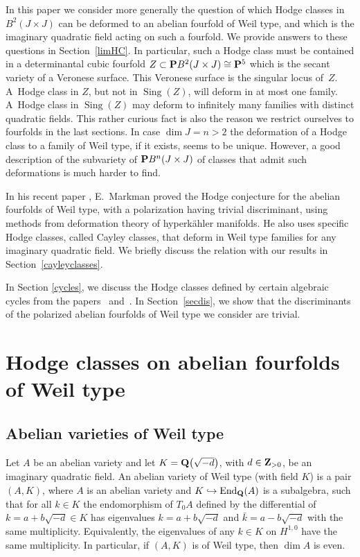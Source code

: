 \documentclass[10pt,a4paper]{amsart}
\numberwithin{equation}{section}
\begin{document}
In this paper we consider more generally the question
of which Hodge classes in $B^2(J\times J)$
can be deformed to an abelian fourfold of Weil type,
and which is the imaginary quadratic field acting on such a fourfold.
We provide answers to these questions in Section~\ref{limHC}.
In particular, such a Hodge class must be contained
in a determinantal cubic fourfold $Z\subset {\bf P} B^2(J\times J)\cong {\bf P}^5$
which is the secant variety of a Veronese surface.
This Veronese surface is the singular locus of~$Z$. A~Hodge class in $Z$, but not in $\operatorname{Sing}(Z)$,
will deform in at most one family. A~Hodge class in $\operatorname{Sing}(Z)$ may
deform to infinitely many families with distinct quadratic fields.
This rather curious fact is also the reason we restrict ourselves to fourfolds in the last sections.
In case $\dim J=n>2$ the deformation of a Hodge class to a family of Weil type, if it exists,
seems to be unique. However, a good description of the subvariety of ${\bf P} B^n(J\times J)$ of classes
that admit such deformations is much harder to find.

In his recent paper \cite{Markman}, E.~Markman
proved the Hodge conjecture for the
abelian fourfolds of Weil type,
with a polarization having trivial discriminant, using methods
from deformation theory of hyperk\"ahler manifolds. He also uses specific Hodge classes,
called Cayley classes, that deform in Weil type families for any imaginary quadratic field.
We briefly discuss the relation with our results in Section~\ref{cayleyclasses}.

In Section \ref{cycles}, we discuss the Hodge classes defined by certain algebraic
cycles from the papers~\cite{schoen} and~\cite{vG}.
In Section~\ref{secdis}, we show that the discriminants of the polarized abelian fourfolds
of Weil type we consider are trivial.

\section{Hodge classes on abelian fourfolds of Weil type}\label{ab4w}

\subsection{Abelian varieties of Weil type}
Let $A$ be an abelian variety and let $K={\bf Q}\big(\sqrt{-d}\big)$, with $d\in{\bf Z}_{>0}$,
be an imaginary quadratic field. An abelian variety of Weil type (with field
$K$) is a pair $(A,K)$, where $A$ is an abelian variety and $K\hookrightarrow \operatorname{End}_{\bf Q}(A)$
is a subalgebra, such that for all $k\in K$
the endomorphism of $T_0A$
defined by the differential of $k=a+b\sqrt{-d}\in K$
has eigenvalues $k=a+b\sqrt{-d}$ and $\bar{k}=a-b\sqrt{-d}$ with the same multiplicity.
Equivalently, the eigenvalues of any $k\in K$ on $H^{1,0}$ have the same multiplicity.
In particular, if $(A,K)$ is of Weil type, then $\dim A$ is even.
\end{document}
